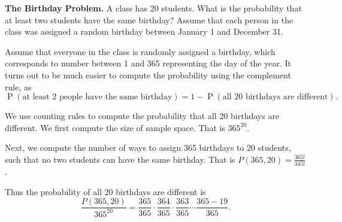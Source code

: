 \documentclass[answers,11pt]{exam}
\DeclareMathOperator*{\Prob}{P}
\renewcommand{\Pr}{\Prob}
\begin{document}
\begin{questions}
{\newpage
\question \textbf{The Birthday Problem.} A class has 20 students.  What is the probability that at least
two students have the same birthday?  Assume that each person in the class was
assigned a random birthday between January 1 and December 31.

\begin{solution}
Assume that everyone in the class is randomly assigned a birthday, which
corresponds to number between 1 and 365 representing the day of the year.
It turns out to be much easier to compute the probability using the complement
rule, as
\[
  \Pr(\text{at least 2 people have the same birthday})
  = 1 - \Pr(\text{all 20 birthdays are different}).
\]

We use counting rules to compute the probability that all 20 birthdays are different. 
We first compute the size of sample space. That is $365^{20}$.

Next, we compute the number of ways to assign 365 birthdays to 20 students, such that no two students can have the same birthday.
That is $P(365,20)=\frac{365!}{345!}$.

Thus the probability of all 20 birthdays are different is
$$\frac{P(365,20)}{365^{20}} = \frac{365}{365}\cdot \frac{364}{365}\cdot\frac{363}{365}\cdots \frac{365-19}{365}.$$

\end{solution}



}

\end{questions}
\end{document}
